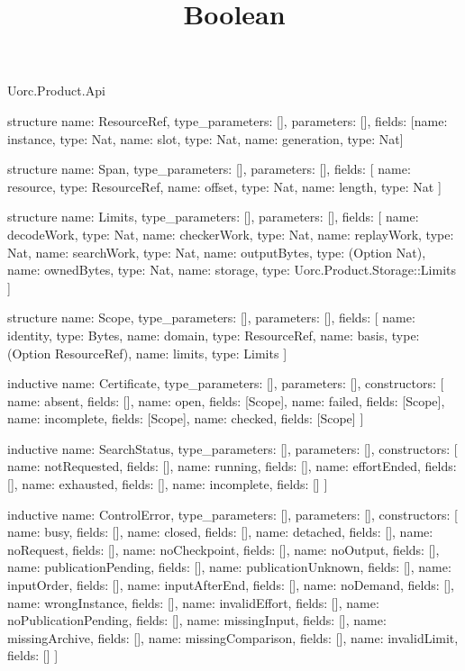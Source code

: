 \begin{lexlean}{Uorc.Product.Api}
\title{Boolean}
\begin{semanticmodule}
structure{
  name: ResourceRef,
  type_parameters: [],
  parameters: [],
  fields: [{name: instance, type: Nat}, {name: slot, type: Nat}, {name: generation, type: Nat}]
}

structure{
  name: Span,
  type_parameters: [],
  parameters: [],
  fields: [
    {name: resource, type: ResourceRef},
    {name: offset, type: Nat},
    {name: length, type: Nat}
  ]
}

structure{
  name: Limits,
  type_parameters: [],
  parameters: [],
  fields: [
    {name: decodeWork, type: Nat},
    {name: checkerWork, type: Nat},
    {name: replayWork, type: Nat},
    {name: searchWork, type: Nat},
    {name: outputBytes, type: (Option Nat)},
    {name: ownedBytes, type: Nat},
    {name: storage, type: Uorc.Product.Storage::Limits}
  ]
}

structure{
  name: Scope,
  type_parameters: [],
  parameters: [],
  fields: [
    {name: identity, type: Bytes},
    {name: domain, type: ResourceRef},
    {name: basis, type: (Option ResourceRef)},
    {name: limits, type: Limits}
  ]
}

inductive{
  name: Certificate,
  type_parameters: [],
  parameters: [],
  constructors: [
    {name: absent, fields: []},
    {name: open, fields: [Scope]},
    {name: failed, fields: [Scope]},
    {name: incomplete, fields: [Scope]},
    {name: checked, fields: [Scope]}
  ]
}

inductive{
  name: SearchStatus,
  type_parameters: [],
  parameters: [],
  constructors: [
    {name: notRequested, fields: []},
    {name: running, fields: []},
    {name: effortEnded, fields: []},
    {name: exhausted, fields: []},
    {name: incomplete, fields: []}
  ]
}

inductive{
  name: ControlError,
  type_parameters: [],
  parameters: [],
  constructors: [
    {name: busy, fields: []},
    {name: closed, fields: []},
    {name: detached, fields: []},
    {name: noRequest, fields: []},
    {name: noCheckpoint, fields: []},
    {name: noOutput, fields: []},
    {name: publicationPending, fields: []},
    {name: publicationUnknown, fields: []},
    {name: inputOrder, fields: []},
    {name: inputAfterEnd, fields: []},
    {name: noDemand, fields: []},
    {name: wrongInstance, fields: []},
    {name: invalidEffort, fields: []},
    {name: noPublicationPending, fields: []},
    {name: missingInput, fields: []},
    {name: missingArchive, fields: []},
    {name: missingComparison, fields: []},
    {name: invalidLimit, fields: []}
  ]
}


\end{semanticmodule}
\end{lexlean}
